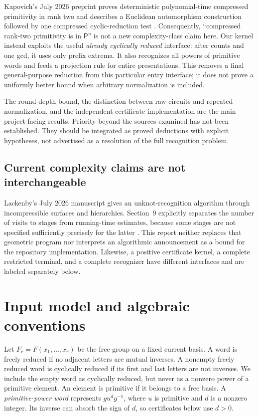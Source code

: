 \documentclass[11pt,letterpaper]{article}
\theoremstyle{definition}
\begin{document}
Kapovich's July 2026 preprint proves deterministic polynomial-time compressed
primitivity in rank two and describes a Euclidean automorphism construction
followed by one compressed cyclic-reduction test \cite[Section~8]{Kapovich}.
Consequently, ``compressed rank-two primitivity is in $\mathsf P$'' is not a
new complexity-class claim here. Our kernel instead exploits the useful
\emph{already cyclically reduced} interface: after counts and one gcd, it
uses only prefix extrema. It also recognizes all powers of primitive words
and feeds a projection rule for entire presentations. This removes a final
general-purpose reduction from this particular entry interface; it does not
prove a uniformly better bound when arbitrary normalization is included.

The round-depth bound, the distinction between raw circuits and repeated
normalization, and the independent certificate implementation are the main
project-facing results. Priority beyond the sources examined has not been
established. They should be integrated as proved deductions with explicit
hypotheses, not advertised as a resolution of the full recognition problem.

\subsection{Current complexity claims are not interchangeable}
Lackenby's July 2026 manuscript gives an unknot-recognition algorithm through
incompressible surfaces and hierarchies. Section~9 explicitly separates the
number of visits to stages from running-time estimates, because some stages
are not specified sufficiently precisely for the latter \cite[Section~9]{Lackenby}.
This report neither replaces that geometric program nor interprets an
algorithmic announcement as a bound for the repository implementation.
Likewise, a positive certificate kernel, a complete restricted terminal, and
a complete recognizer have different interfaces and are labeled separately
below.

\section{Input model and algebraic conventions}
\label{sec:model}
Let $F_r=F(x_1,\ldots,x_r)$ be the free group on a fixed current basis.
A word is freely reduced if no adjacent letters are mutual inverses. A
nonempty freely reduced word is cyclically reduced if its first and last
letters are not inverses. We include the empty word as cyclically reduced,
but never as a nonzero power of a primitive element. An element is primitive
if it belongs to a free basis. A \emph{primitive-power word} represents
$g u^d g^{-1}$, where $u$ is primitive and $d$ is a nonzero integer. Its inverse
can absorb the sign of $d$, so certificates below use $d>0$.
\end{document}
